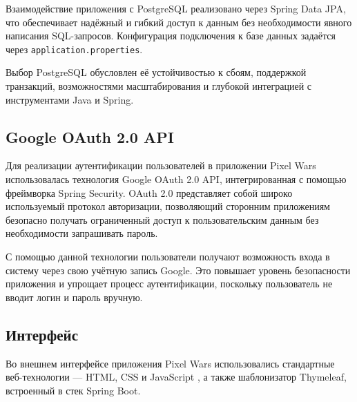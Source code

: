 Взаимодействие приложения с PostgreSQL реализовано через Spring Data JPA, что обеспечивает надёжный и гибкий доступ к данным без необходимости явного написания SQL-запросов. Конфигурация подключения к базе данных задаётся через \texttt{application.properties}.

Выбор PostgreSQL обусловлен её устойчивостью к сбоям, поддержкой транзакций, возможностями масштабирования и глубокой интеграцией с инструментами Java и Spring.

\subsection{Google OAuth 2.0 API}

Для реализации аутентификации пользователей в приложении Pixel Wars использовалась технология Google OAuth 2.0 API, интегрированная с помощью фреймворка Spring Security. OAuth 2.0 представляет собой широко используемый протокол авторизации, позволяющий сторонним приложениям безопасно получать ограниченный доступ к пользовательским данным без необходимости запрашивать пароль.

С помощью данной технологии пользователи получают возможность входа в систему через свою учётную запись Google. Это повышает уровень безопасности приложения и упрощает процесс аутентификации, поскольку пользователь не вводит логин и пароль вручную.



\subsection{Интерфейс}

Во внешнем интерфейсе приложения Pixel Wars использовались стандартные веб-технологии — HTML, CSS и JavaScript \cite{mdn}, а также шаблонизатор Thymeleaf, встроенный в стек Spring Boot.

